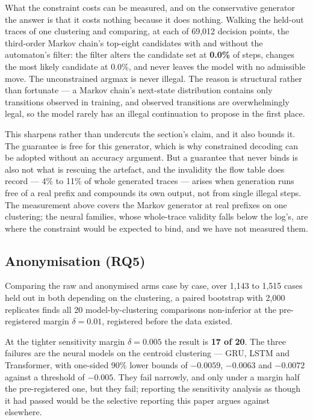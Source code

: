 What the constraint costs can be measured, and on the conservative generator the answer is that
it costs nothing because it does nothing. Walking the held-out traces of one clustering and
comparing, at each of 69{,}012 decision points, the third-order Markov chain's top-eight
candidates with and without the automaton's filter: the filter alters the candidate set at
\textbf{0.0\%} of steps, changes the most likely candidate at 0.0\%, and never leaves the model
with no admissible move. The unconstrained argmax is never illegal. The reason is structural
rather than fortunate --- a Markov chain's next-state distribution contains only transitions
observed in training, and observed transitions are overwhelmingly legal, so the model rarely has
an illegal continuation to propose in the first place.

This sharpens rather than undercuts the section's claim, and it also bounds it. The guarantee is
free for this generator, which is why constrained decoding can be adopted without an accuracy
argument. But a guarantee that never binds is also not what is rescuing the artefact, and the
invalidity the flow table does record --- 4\% to 11\% of whole generated traces --- arises when
generation runs free of a real prefix and compounds its own output, not from single illegal
steps. The measurement above covers the Markov generator at real prefixes on one clustering; the
neural families, whose whole-trace validity falls below the log's, are where the constraint
would be expected to bind, and we have not measured them.



\subsection{Anonymisation (RQ5)}\label{sec:res-rq5}

Comparing the raw and anonymised arms case by case, over 1{,}143 to 1{,}515 cases held out in
both depending on the clustering, a
paired bootstrap with 2{,}000 replicates finds all 20 model-by-clustering comparisons
non-inferior at the pre-registered margin $\delta = 0.01$, registered before the data existed.

At the tighter sensitivity margin $\delta = 0.005$ the result is \textbf{17 of 20}. The three
failures are the neural models on the centroid clustering --- GRU, LSTM and Transformer, with
one-sided 90\% lower bounds of $-0.0059$, $-0.0063$ and $-0.0072$ against a threshold of
$-0.005$. They fail narrowly, and only under a margin half the pre-registered one, but they
fail; reporting the sensitivity analysis as though it had passed would be the selective
reporting this paper argues against elsewhere.

